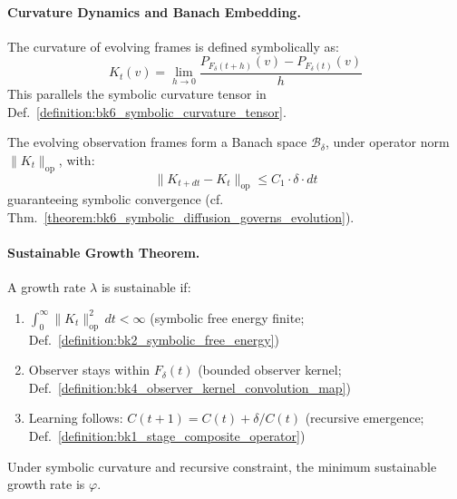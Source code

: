 \paragraph{Curvature Dynamics and Banach Embedding.}
\label{paragraph:appC_curvature_dynamics_and_banach_embedding}

\begin{definition}
\label{def:appC_frame_curvature_operator}
The curvature of evolving frames is defined symbolically as:
\[
K_t(v) = \lim_{h \to 0} \frac{P_{F_\delta(t+h)}(v) - P_{F_\delta(t)}(v)}{h}
\]
This parallels the symbolic curvature tensor in Def.~\ref{definition:bk6_symbolic_curvature_tensor}.
\end{definition}

\begin{lemma}
\label{lem:appC_banach_space_of_curvature_flows}
The evolving observation frames form a Banach space $\mathcal{B}_\delta$, under operator norm $\|K_t\|_{\mathrm{op}}$, with:
\[
\|K_{t+dt} - K_t\|_{\text{op}} \leq C_1 \cdot \delta \cdot dt
\]
guaranteeing symbolic convergence (cf. Thm.~\ref{theorem:bk6_symbolic_diffusion_governs_evolution}).
\end{lemma}

\paragraph{Sustainable Growth Theorem.}
\label{paragraph:appC_main_theorem_phi_as_mimiimal_growth_rate}

\begin{definition}
\label{def:appC_sustainable_growth_rate}
A growth rate $\lambda$ is sustainable if:
\begin{enumerate}
    \item $\int_0^\infty \|K_t\|^2_{\text{op}}\,dt < \infty$ (symbolic free energy finite; Def.~\ref{definition:bk2_symbolic_free_energy})
    \item Observer stays within $F_\delta(t)$ (bounded observer kernel; Def.~\ref{definition:bk4_observer_kernel_convolution_map})
    \item Learning follows: $C(t+1) = C(t) + \delta/C(t)$ (recursive emergence; Def.~\ref{definition:bk1_stage_composite_operator})
\end{enumerate}
\end{definition}

\begin{theorem}
\label{theorem:appC_phi_min_growth}
Under symbolic curvature and recursive constraint, the minimum sustainable growth rate is $\varphi$.
\end{theorem}

